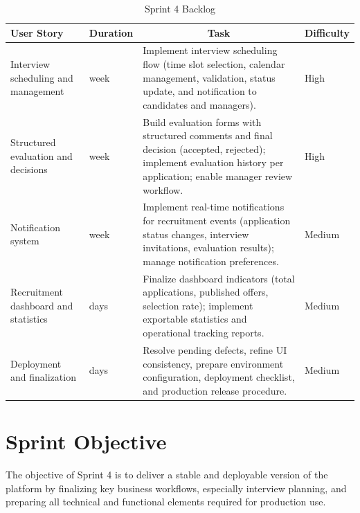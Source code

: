 \setlength{\tabcolsep}{4pt}
\renewcommand{\arraystretch}{1.5}
\begin{table}[H]
\centering
\small
\begin{tabularx}{\textwidth}{|>{\centering\arraybackslash}p{3.2cm}|>{\centering\arraybackslash}p{1.6cm}|X|>{\centering\arraybackslash}p{1.8cm}|}
\hline
\rowcolor{headerblue}
\textbf{User Story} & \textbf{Duration} & \multicolumn{1}{c|}{\textbf{Task}} & \textbf{Difficulty} \\
\hline
Interview scheduling and management
	& 1 week
	& Implement interview scheduling flow (time slot selection, calendar management, validation, status update, and notification to candidates and managers).
	& High \\
\hline
Structured evaluation and decisions
	& 1 week
	& Build evaluation forms with structured comments and final decision (accepted, rejected); implement evaluation history per application; enable manager review workflow.
	& High \\
\hline
Notification system
	& 1 week
	& Implement real-time notifications for recruitment events (application status changes, interview invitations, evaluation results); manage notification preferences.
	& Medium \\
\hline
Recruitment dashboard and statistics
	& 4 days
	& Finalize dashboard indicators (total applications, published offers, selection rate); implement exportable statistics and operational tracking reports.
	& Medium \\
\hline
Deployment and finalization
	& 3 days
	& Resolve pending defects, refine UI consistency, prepare environment configuration, deployment checklist, and production release procedure.
	& Medium \\
\hline
\end{tabularx}
\caption{Sprint 4 Backlog}
\label{tab:sprint4backlog}
\end{table}
\normalsize
\setlength{\tabcolsep}{6pt}
\renewcommand{\arraystretch}{1}

\section{Sprint Objective}

The objective of Sprint 4 is to deliver a stable and deployable version of the platform by finalizing key business workflows, especially interview planning, and preparing all technical and functional elements required for production use.

